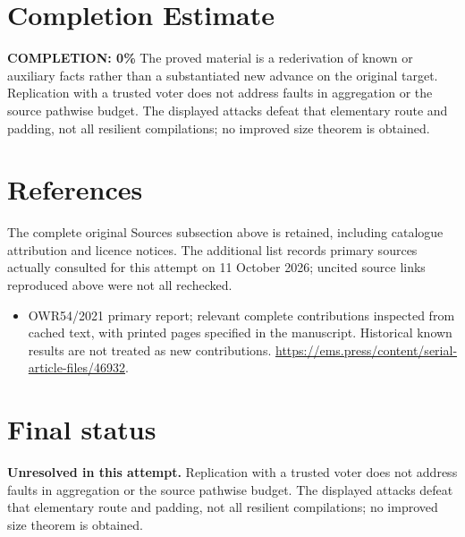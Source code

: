 \documentclass[11pt]{article}
\begin{document}
\section{Completion Estimate}
\noindent\textbf{COMPLETION: 0\%}
The proved material is a rederivation of known or auxiliary facts rather than a substantiated new advance on the original target. Replication with a trusted voter does not address faults in aggregation or the source pathwise budget. The displayed attacks defeat that elementary route and padding, not all resilient compilations; no improved size theorem is obtained.
\section{References}
The complete original Sources subsection above is retained, including catalogue attribution and licence notices. The additional list records primary sources actually consulted for this attempt on 11 October 2026; uncited source links reproduced above were not all rechecked.
\begin{itemize}
\item OWR54/2021 primary report; relevant complete contributions inspected from cached text, with printed pages specified in the manuscript. Historical known results are not treated as new contributions. \url{https://ems.press/content/serial-article-files/46932}.
\end{itemize}
\section{Final status}
\textbf{Unresolved in this attempt.} Replication with a trusted voter does not address faults in aggregation or the source pathwise budget. The displayed attacks defeat that elementary route and padding, not all resilient compilations; no improved size theorem is obtained.
\end{document}
